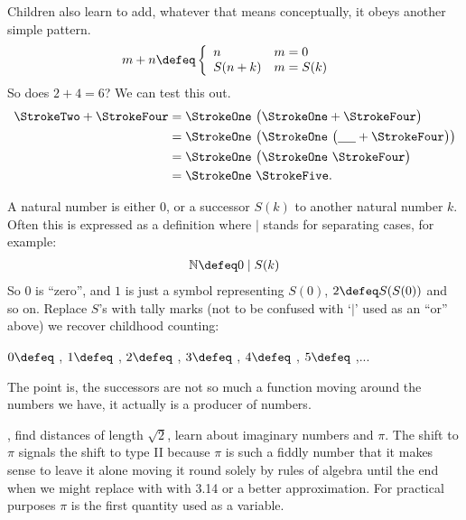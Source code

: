 Children also learn to add, whatever that means conceptually, it obeys 
another simple pattern.
\begin{align*}
    m+n & \defeq\left\{ 
    \begin{array}{ll}
        n & m = 0\\
        S(n+k) & m=S(k)
    \end{array}
    \right.
\end{align*}
So does $2+4=6$?  We can test this out.
\begin{align*}
    \text{\StrokeTwo}+\text{\StrokeFour} & = \text{\StrokeOne}~ \big(\text{\StrokeOne} +\text{\StrokeFour}\big)\\
    & = \text{\StrokeOne}~ \big( \text{\StrokeOne}~\big(\underline{\hspace{5mm}}+\StrokeFour\big)\big)\\
    & = \text{\StrokeOne}~ \big( \text{\StrokeOne}~\StrokeFour\big)\\
    & = \text{\StrokeOne}~ \text{\StrokeFive}.
\end{align*}


A natural number is either $0$, or a successor 
$S(k)$ to 
another natural number $k$.  Often this is expressed as a 
definition where $\mid$ stands for separating cases, 
for example:
\begin{align*}
    \mathbb{N} \defeq 0 \mid S(k)
\end{align*}
So $0$ is ``zero'', and $1$ is just a symbol representing $S(0)$, 
$2\defeq S(S(0))$ and so on.  Replace $S$'s with tally marks (not to be 
confused with `$|$' used as an ``or'' above)
we recover childhood counting:
\begin{center}
    $0\defeq$ \underline{\hspace{5mm}}, 
    $1\defeq$ \StrokeOne,
    $2\defeq$ \StrokeTwo,
    $3\defeq$ \StrokeThree,
    $4\defeq$ \StrokeFour,
    $5\defeq$ \StrokeFive,...
\end{center}
The point is, the successors are not so much a function 
moving around the numbers we have, it actually is a producer 
of numbers. 

, find distances of
length $\sqrt{2}$, learn about imaginary numbers and $\pi$.  The shift to $\pi$
signals the shift to type II because $\pi$ is such a fiddly number that it
makes sense to leave it alone moving it round solely by rules of algebra until
the end when we might replace with with 3.14 or a better approximation. For
practical purposes $\pi$ is the first quantity used as a variable. 

